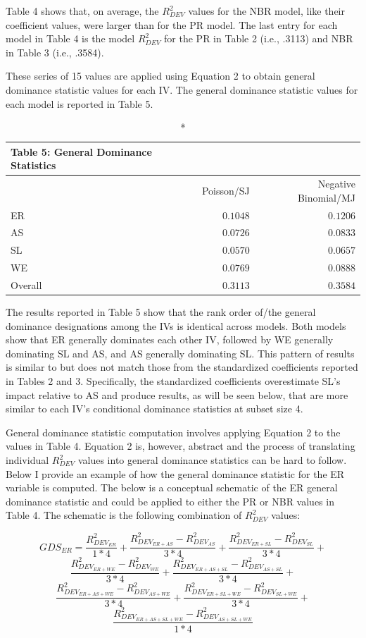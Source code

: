 \documentclass[ShortAfour,times,sageapa]{sagej}
\begin{document}
	Table 4 shows that, on average, the $R^2_{DEV}$ values for the NBR model, like their coefficient values, were larger than for the PR model.
	The last entry for each model in Table 4 is the model $R^2_{DEV}$ for the PR in Table 2 (i.e., .3113) and NBR in Table 3 (i.e., .3584).

	These series of 15 values are applied using Equation 2 to obtain general dominance statistic values for each IV.
	The general dominance statistic values for each model is reported in Table 5.
	
	\begin{longtable}{l|rr}
		\caption*{
			{\large Table 5: General Dominance Statistics}
		} \\ 
		\toprule
		\multicolumn{1}{l}{} & Poisson/SJ & Negative Binomial/MJ \\ 
		\midrule
		ER & $0.1048$ & $0.1206$ \\ 
		AS & $0.0726$ & $0.0833$ \\ 
		SL & $0.0570$ & $0.0657$ \\ 
		WE & $0.0769$ & $0.0888$ \\ 
		\midrule
		Overall & $0.3113$ & $0.3584$ \\ 
		\bottomrule
	\end{longtable}

	The results reported in Table 5 show that the rank order of/the general dominance designations among the IVs is identical across models.
	Both models show that ER generally dominates each other IV, followed by WE generally dominating SL and AS, and AS generally dominating SL.
	This pattern of results is similar to but does not match those from the standardized coefficients reported in Tables 2 and 3.
	Specifically, the standardized coefficients overestimate SL's impact relative to AS and produce results, as will be seen below, that are more similar to each IV's conditional dominance statistics at subset size 4.
	
	General dominance statistic computation involves applying Equation 2 to the values in Table 4. 
	Equation 2 is, however, abstract and the process of translating individual $R^2_{DEV}$ values into general dominance statistics can be hard to follow.
	Below I provide an example of how the general dominance statistic for the ER variable is computed.
	The below is a conceptual schematic of the ER general dominance statistic and could be applied to either the PR or NBR values in Table 4.
	The schematic is the following combination of $R^2_{DEV}$ values:
	
	$$GDS_{ER} = \frac{R^2_{DEV_{ER}}}{1*4} + \frac{R^2_{DEV_{ER + AS}} - R^2_{DEV_{AS}}}{3*4} + \frac{R^2_{DEV_{ER + SL}} - R^2_{DEV_{SL}}}{3*4} + $$
	$$\frac{R^2_{DEV_{ER + WE}} - R^2_{DEV_{WE}}}{3*4} + \frac{R^2_{DEV_{ER + AS + SL}} - R^2_{DEV_{AS + SL}}}{3*4} + $$ 
	$$\frac{R^2_{DEV_{ER + AS + WE}} - R^2_{DEV_{AS + WE}}}{3*4} + \frac{R^2_{DEV_{ER + SL + WE}} - R^2_{DEV_{SL + WE}}}{3*4} + $$
	$$\frac{R^2_{DEV_{ER + AS + SL + WE}} - R^2_{DEV_{AS + SL + WE}}}{1*4}$$
	
\end{document}
